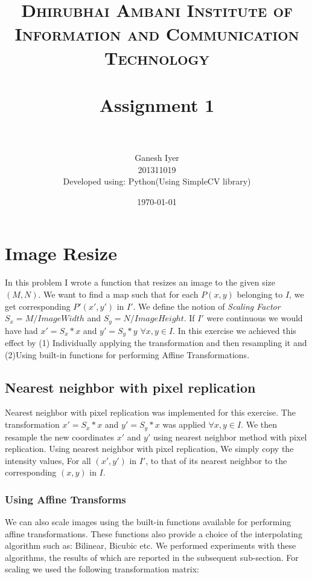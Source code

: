 \documentclass[paper=a4, fontsize=11pt]{scrartcl} %
\title{	
\normalfont \normalsize 
\textsc{Dhirubhai Ambani Institute of Information and Communication Technology} \\ [25pt] %
\horrule{0.5pt} \\[0.4cm] %
\huge Assignment 1 \\ %
\horrule{2pt} \\[0.5cm] %
}
\author{Ganesh Iyer \\ 201311019 \\Developed using: Python(Using SimpleCV library)}
\date{\normalsize\today} %
\numberwithin{equation}{section} %
\numberwithin{figure}{section} %
\numberwithin{table}{section} %
\begin{document}
\maketitle %


\section{Image Resize}

In this problem I wrote a function that resizes an image to the given size \((M,N)\). We want to find a map such that for each \(P(x,y)\) belonging to \(I\), we get corresponding \(P'(x',y')\) in \(I'\). We define the notion of \textsl{Scaling Factor} \(S_x = M/ImageWidth\) and \(S_y = N/ImageHeight\). If \(I'\) were continuous we would have had \(x' = S_x*x\) and \(y' = S_y*y\) \(\forall x,y \in I\). In this exercise we achieved this effect by (1) Individually applying the transformation and then resampling it and (2)Using built-in functions for performing Affine Transformations.

\subsection{Nearest neighbor with pixel replication}

Nearest neighbor with pixel replication was implemented for this exercise. The transformation \(x' = S_x*x\) and \(y' = S_y*x\) was applied \(\forall x,y \in I\). We then resample the new coordinates \(x'\) and \(y'\) using  nearest neighbor method with pixel replication. 
Using nearest neighbor with pixel replication, We simply copy the intensity values, For all \((x', y')\) in \(I'\), to that of its nearest neighbor to the corresponding \((x,y)\) in \(I\). 


\subsubsection{Using Affine Transforms}

We can also scale images using the built-in functions available for performing affine transformations. These functions also provide a choice of the interpolating algorithm such as: Bilinear, Bicubic etc. We performed experiments with these algorithms, the results of which are reported in the subsequent sub-section. For scaling we used the following transformation matrix:
\end{document}

